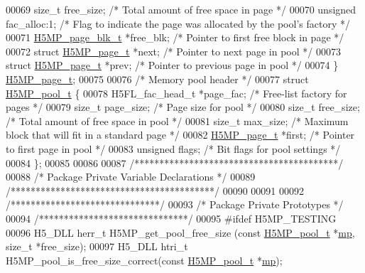 \begin{DoxyCode}
00069     \textcolor{keywordtype}{size\_t} free\_size;                   \textcolor{comment}{/* Total amount of free space in page */}
00070     \textcolor{keywordtype}{unsigned} fac\_alloc:1;               \textcolor{comment}{/* Flag to indicate the page was allocated by the pool's factory */}
00071     \hyperlink{struct_h5_m_p__page__blk__t}{H5MP\_page\_blk\_t} *free\_blk;          \textcolor{comment}{/* Pointer to first free block in page */}
00072     \textcolor{keyword}{struct }\hyperlink{struct_h5_m_p__page__t}{H5MP\_page\_t} *next;           \textcolor{comment}{/* Pointer to next page in pool */}
00073     \textcolor{keyword}{struct }\hyperlink{struct_h5_m_p__page__t}{H5MP\_page\_t} *prev;           \textcolor{comment}{/* Pointer to previous page in pool */}
00074 \} \hyperlink{struct_h5_m_p__page__t}{H5MP\_page\_t};
00075 
00076 \textcolor{comment}{/* Memory pool header */}
00077 \textcolor{keyword}{struct }\hyperlink{struct_h5_m_p__pool__t}{H5MP\_pool\_t} \{
00078     H5FL\_fac\_head\_t *page\_fac;  \textcolor{comment}{/* Free-list factory for pages */}
00079     \textcolor{keywordtype}{size\_t} page\_size;           \textcolor{comment}{/* Page size for pool */}
00080     \textcolor{keywordtype}{size\_t} free\_size;           \textcolor{comment}{/* Total amount of free space in pool */}
00081     \textcolor{keywordtype}{size\_t} max\_size;            \textcolor{comment}{/* Maximum block that will fit in a standard page */}
00082     \hyperlink{struct_h5_m_p__page__t}{H5MP\_page\_t} *first;         \textcolor{comment}{/* Pointer to first page in pool */}
00083     \textcolor{keywordtype}{unsigned} flags;             \textcolor{comment}{/* Bit flags for pool settings */}
00084 \};
00085 
00086 
00087 \textcolor{comment}{/*****************************************/}
00088 \textcolor{comment}{/* Package Private Variable Declarations */}
00089 \textcolor{comment}{/*****************************************/}
00090 
00091 
00092 \textcolor{comment}{/******************************/}
00093 \textcolor{comment}{/* Package Private Prototypes */}
00094 \textcolor{comment}{/******************************/}
00095 \textcolor{preprocessor}{#ifdef H5MP\_TESTING}
00096 H5\_DLL herr\_t H5MP\_get\_pool\_free\_size (\textcolor{keyword}{const} \hyperlink{struct_h5_m_p__pool__t}{H5MP\_pool\_t} *\hyperlink{namespaceboost_1_1multiprecision}{mp}, \textcolor{keywordtype}{size\_t} *free\_size);
00097 H5\_DLL htri\_t H5MP\_pool\_is\_free\_size\_correct(\textcolor{keyword}{const} \hyperlink{struct_h5_m_p__pool__t}{H5MP\_pool\_t} *\hyperlink{namespaceboost_1_1multiprecision}{mp});

\end{DoxyCode}
